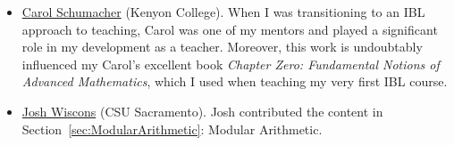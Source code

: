 \documentclass[12pt,oneside]{book}
\theoremstyle{definition}
\begin{document}
\begin{itemize}
\item \href{http://www2.kenyon.edu/Depts/Math/schumacherc/public_html/}{Carol Schumacher} (Kenyon College). When I was transitioning to an IBL approach to teaching, Carol was one of my mentors and played a significant role in my development as a teacher.  Moreover, this work is undoubtably influenced my Carol's excellent book \emph{Chapter Zero: Fundamental Notions of Advanced Mathematics}, which I used when teaching my very first IBL course.
\item \href{http://webpages.csus.edu/wiscons/}{Josh Wiscons} (CSU Sacramento). Josh contributed the content in Section~\ref{sec:ModularArithmetic}: Modular Arithmetic.
\end{itemize}

\tableofcontents
\thispagestyle{empty}



























%










%



\end{document}
